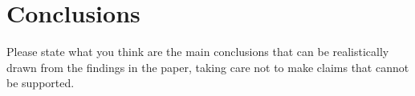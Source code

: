 \section*{Conclusions}
Please state what you think are the main conclusions that can be realistically drawn from the findings in the paper, taking care not to make claims that cannot be supported.